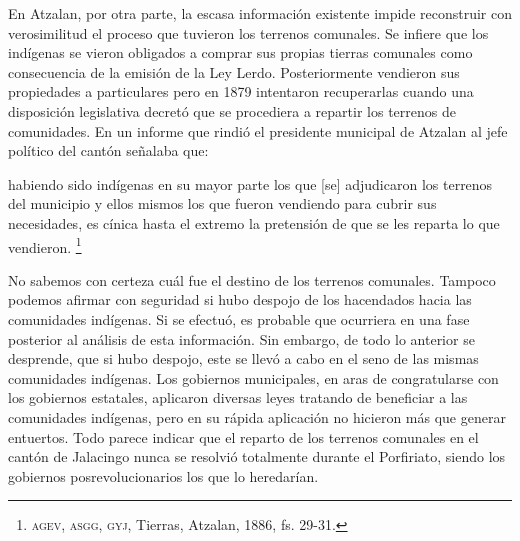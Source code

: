 \documentclass[14pt,twoside,final]{extbook} %
\let\oldfootnote\footnote
\renewcommand\footnote[1]{%
\oldfootnote{\hspace{1mm}#1}}
\begin{document}
En Atzalan, por otra parte, la escasa información existente impide reconstruir con verosimilitud el proceso que tuvieron los terrenos comunales. Se infiere que los indígenas se vieron obligados a comprar sus propias tierras comunales como consecuencia de la emisión de la Ley Lerdo. Posteriormente vendieron sus propiedades a particulares pero en 1879 intentaron recuperarlas cuando una disposición legislativa decretó que se procediera a repartir los terrenos de comunidades. En un informe que rindió el presidente municipal de Atzalan al jefe político del cantón señalaba que:
\begin{quoting}
habiendo sido indígenas en su mayor parte los que [se] adjudicaron los terrenos del municipio y ellos mismos los que fueron vendiendo para cubrir sus necesidades, es cínica hasta el extremo la pretensión de que se les reparta lo que vendieron.\footnote{\textsc{agev, asgg, gyj}, Tierras, Atzalan, 1886, fs. 29-31.}
\end{quoting}
No sabemos con certeza cuál fue el destino de los terrenos comunales. Tampoco podemos afirmar con seguridad si hubo despojo de los hacendados hacia las comunidades indígenas. Si se efectuó, es probable que ocurriera en una fase posterior al análisis de esta información. Sin embargo, de todo lo anterior se desprende, que si hubo despojo, este se llevó a cabo en el seno de las mismas comunidades indígenas. Los gobiernos municipales, en aras de congratularse con los gobiernos estatales, aplicaron
diversas leyes tratando de beneficiar a las comunidades indígenas, pero en su rápida aplicación no hicieron más que generar entuertos. Todo parece indicar que el reparto de los terrenos comunales en el cantón de Jalacingo nunca se resolvió totalmente durante el Porfiriato, siendo los gobiernos posrevolucionarios los que lo heredarían.
\end{document}
